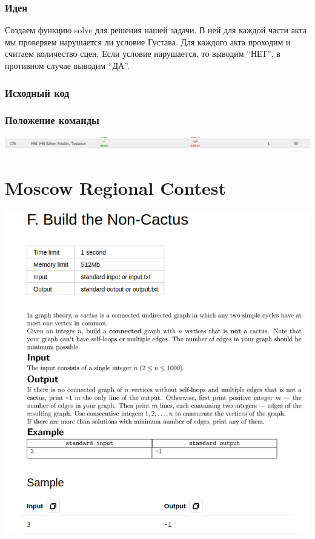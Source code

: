 \documentclass[12pt]{article}
\begin{document}
\subsubsection*{Идея}
Создаем функцию solve для решения нашей задачи. В ней для каждой части акта мы проверяем нарушается ли условие Густава. Для каждого акта проходим и считаем количество сцен. 
Если условие нарушается, то выводим “НЕТ”, в противном случае выводим “ДА”.
\\ 
\subsubsection*{Исходный код}

\subsubsection*{Положение команды}
\includegraphics[scale=0.5]{images/Vsesib.png}\newline\noindent

\pagebreak
\section{Moscow Regional Contest}
\includegraphics[scale=0.75]{statements/QuarterFinal_F.png}
\end{document}
